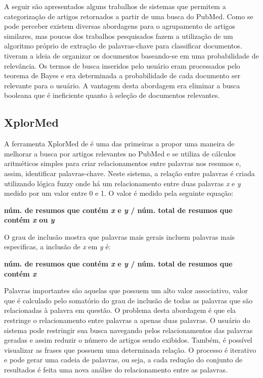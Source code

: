 A seguir são apresentados alguns trabalhos de sistemas que permitem a categorização de artigos retornados a partir de uma busca do PubMed. Como se pode perceber existem diversas abordagens para o agrupamento de artigos similares, mas poucos dos trabalhos pesquisados fazem a utilização de um algoritmo próprio de extração de palavras-chave para classificar documentos. \cite{Maron1958} tiveram a ideia de organizar os documentos baseando-se em uma probabilidade de relevância. Os termos de busca inseridos pelo usuário eram processados pelo teorema de Bayes e era determinada a probabilidade de cada documento ser relevante para o usuário. A vantagem desta abordagem era eliminar a busca booleana que é ineficiente quanto à seleção de documentos relevantes.

\subsection{XplorMed}
A ferramenta XplorMed de \cite{Perez-Iratxeta2001} é uma das primeiras a propor uma maneira de melhorar a busca por artigos relevantes no PubMed e se utiliza de cálculos aritméticos simples para criar relacionamentos entre palavras nos resumos e, assim, identificar palavras-chave. Neste sistema, a relação entre palavras é criada utilizando lógica fuzzy onde há um relacionamento entre duas palavras \emph{x} e \emph{y} medido por um valor entre 0 e 1. O valor é medido pela seguinte equação:

\begin{centering}
\textbf{
núm. de resumos que contém \emph{x} e \emph{y} / núm. total de resumos que contém \emph{x} ou \emph{y}
}
\end{centering}

O grau de inclusão mostra que palavras mais gerais incluem palavras mais especificas, a inclusão de \emph{x} em \emph{y} é:

\begin{centering}
\textbf{
núm. de resumos que contém \emph{x} e \emph{y} / núm. total de resumos que contém \emph{x}
}
\end{centering}

Palavras importantes são aquelas que possuem um alto valor associativo, valor que é calculado pelo somatório do grau de inclusão de todas as palavras que são relacionadas à palavra em questão. O problema desta abordagem é que ela restringe o relacionamento entre palavras a apenas duas palavras. O usuário do sistema pode restringir sua busca navegando pelos relacionamentos das palavras geradas e assim reduzir o número de artigos sendo exibidos. Também, é possível visualizar as frases que possuem uma determinada relação. O processo é iterativo e pode gerar uma cadeia de palavras, ou seja, a cada redução do conjunto de resultados é feita uma nova análise do relacionamento entre as palavras.

